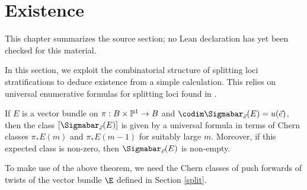 \chapter{Existence}
\label{refined-brill-noether-theory-hurwitz-spaces-chapter-05}

\begin{remark}
\label{refined-brill-noether-theory-hurwitz-spaces-chapter-05-source}
This chapter summarizes the source section; no Lean declaration has yet been
checked for this material.
\notready
\end{remark}

\label{existence}

In this section, we exploit the combinatorial structure of splitting loci stratifications to deduce existence from a simple calculation.
This relies on universal enumerative formulas for splitting loci found in \cite{L}.

\begin{theorem}
\notready \label{mine}
If $E$ is a vector bundle on $\pi: B \times \mathbb{P}^1 \rightarrow B$ and $\codim \Sigmabar_{\vec{e}}(E) = u(\vec{e})$, then the class $[\Sigmabar_{\vec{e}}(E)]$ is given by a universal formula in terms of Chern classes $\pi_* E(m)$ and $\pi_*E(m-1)$ for suitably large $m$. Moreover, if this expected class is non-zero, then $\Sigmabar_{\vec{e}}(E)$ is non-empty.
\end{theorem}

To make use of the above theorem, we need the Chern classes of push forwards of twists of the vector bundle $\E$ defined in Section \ref{split}.

